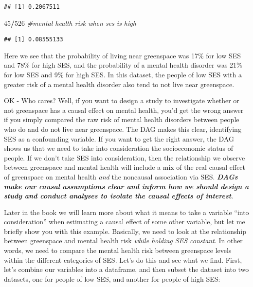 \documentclass[
]{book}
\newenvironment{Shaded}{\begin{snugshade}}{\end{snugshade}}
\newcommand{\CommentTok}[1]{\textcolor[rgb]{0.56,0.35,0.01}{\textit{#1}}}
\newcommand{\DecValTok}[1]{\textcolor[rgb]{0.00,0.00,0.81}{#1}}
\newcommand{\SpecialCharTok}[1]{\textcolor[rgb]{0.81,0.36,0.00}{\textbf{#1}}}
\begin{document}
\begin{verbatim}
## [1] 0.2067511
\end{verbatim}

\begin{Shaded}
\begin{Highlighting}[]
\DecValTok{45}\SpecialCharTok{/}\DecValTok{526} \CommentTok{\#mental health risk when ses is high}
\end{Highlighting}
\end{Shaded}

\begin{verbatim}
## [1] 0.08555133
\end{verbatim}

Here we see that the probability of living near greenspace was 17\% for low SES and 78\% for high SES, and the probability of a mental health disorder was 21\% for low SES and 9\% for high SES. In this dataset, the people of low SES with a greater risk of a mental health disorder also tend to not live near greenspace.

OK - Who cares? Well, if you want to design a study to investigate whether or not greenspace has a causal effect on mental health, you'd get the wrong answer if you simply compared the raw risk of mental health disorders between people who do and do not live near greenspace. The DAG makes this clear, identifying SES as a confounding variable. If you want to get the right answer, the DAG shows us that we need to take into consideration the socioeconomic status of people. If we don't take SES into consideration, then the relationship we observe between greenspace and mental health will include a mix of the real causal effect of greenspace on mental health \emph{and} the noncausal association via SES. \textbf{\emph{DAGs make our causal assumptions clear and inform how we should design a study and conduct analyses to isolate the causal effects of interest}}.

Later in the book we will learn more about what it means to take a variable ``into consideration'' when estimating a causal effect of some other variable, but let me briefly show you with this example. Basically, we need to look at the relationship between greenspace and mental health risk \emph{while holding SES constant}. In other words, we need to compare the mental health risk between greenspace levels within the different categories of SES. Let's do this and see what we find. First, let's combine our variables into a dataframe, and then subset the dataset into two datasets, one for people of low SES, and another for people of high SES:
\end{document}
